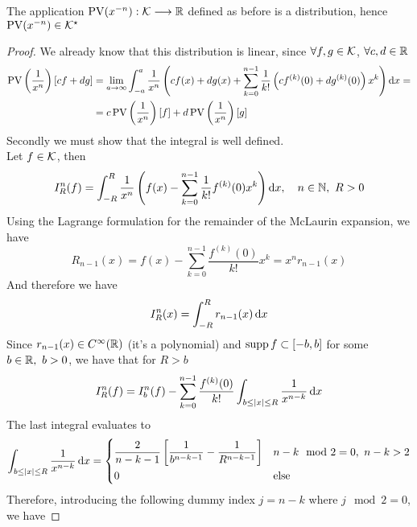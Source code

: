 \documentclass[../complete.tex]{subfiles}
\begin{document}
\begin{thm}
	The application $\operatorname{\mathrm{PV}}(x^{-n}):\mathcal{K}\overset{}{\longrightarrow}\mathbb{R}$ defined as before is a distribution, hence $\operatorname{\mathrm{PV}}(x^{-n })\in\mathcal{K}^\star$
\end{thm}
\begin{proof}
	We already know that this distribution is linear, since $\forall f,g\in\mathcal{K}$, $\forall c,d\in\mathbb{R}$
	\begin{equation*}
		\begin{aligned}
			\operatorname{\mathrm{PV}}\left( \frac{1}{x^n} \right)[cf+dg]&=\lim_{a\to\infty}\int_{-a}^{a}\frac{1}{x^n}\left( cf(x)+dg(x)+\sum_{k=0}^{n-1}\frac{1}{k!}\left( cf^{(k)}(0)+dg^{(k)}(0) \right)x^k \right)\operatorname{d\!} x=\\
			&=c\operatorname{\mathrm{PV}}\left( \frac{1}{x^n} \right)[f]+d\operatorname{\mathrm{PV}}\left( \frac{1}{x^n} \right)[g]
		\end{aligned}
	\end{equation*}
	Secondly we must show that the integral is well defined.\\
	Let $f\in\mathcal{K}$, then
	\begin{equation*}
		I_R^n(f)=\int_{-R}^{R}\frac{1}{x^n}\left( f(x)-\sum_{k=0}^{n-1}\frac{1}{k!}f^{(k)}(0)x^k \right)\operatorname{d\!} x,\quad n\in\mathbb{N},\ R>0
	\end{equation*}
	Using the Lagrange formulation for the remainder of the McLaurin expansion, we have
	\begin{equation*}
		R_{n-1}(x)=f(x)-\sum_{k=0}^{n-1}\frac{f^{(k)}(0)}{k!}x^k=x^nr_{n-1}(x)
	\end{equation*}
	And therefore we have
	\begin{equation*}
		I_R^n(x)=\int_{-R}^{R}r_{n-1}(x)\operatorname{d\!} x
	\end{equation*}
	Since $r_{n-1}(x)\in C^\infty(\mathbb{R})$ (it's a polynomial) and $\operatorname{supp} f\subset[-b,b]$ for some $b\in\R,\ b>0$, we have that for $R>b$
	\begin{equation*}
		I_R^n(f)=I_b^n(f)-\sum_{k=0}^{n-1}\frac{f^{(k)}(0)}{k!}\int_{b\le\abs{x}\le R}^{}\frac{1}{x^{n-k}}\operatorname{d\!} x
	\end{equation*}
	The last integral evaluates to
	\begin{equation*}
		\int_{b\le\abs{x}\le R}^{}\frac{1}{x^{n-k}}\diff x=\begin{dcases}
			\frac{2}{n-k-1}\left[ \frac{1}{b^{n-k-1}}-\frac{1}{R^{n-k-1}} \right]&n-k\mod 2=0,\ n-k>2\\
			0&\text{else}
		\end{dcases}
	\end{equation*}
	Therefore, introducing the following dummy index $j=n-k$ where $j\mod2=0$, we have

\end{proof}
\end{document}
